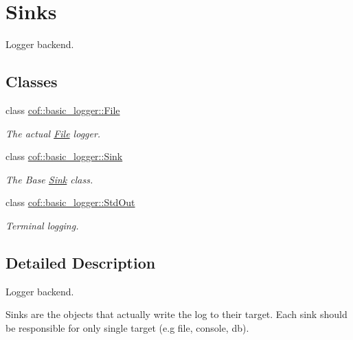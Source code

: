 \hypertarget{group___sinks}{}\section{Sinks}
\label{group___sinks}


Logger backend.  


\subsection*{Classes}
\begin{DoxyCompactItemize}
\item 
class \hyperlink{classcof_1_1basic__logger_1_1_file}{cof\+::basic\+\_\+logger\+::\+File}
\begin{DoxyCompactList}\small\item\em The actual \hyperlink{classcof_1_1basic__logger_1_1_file}{File} logger. \end{DoxyCompactList}\item 
class \hyperlink{classcof_1_1basic__logger_1_1_sink}{cof\+::basic\+\_\+logger\+::\+Sink}
\begin{DoxyCompactList}\small\item\em The Base \hyperlink{classcof_1_1basic__logger_1_1_sink}{Sink} class. \end{DoxyCompactList}\item 
class \hyperlink{classcof_1_1basic__logger_1_1_std_out}{cof\+::basic\+\_\+logger\+::\+Std\+Out}
\begin{DoxyCompactList}\small\item\em Terminal logging. \end{DoxyCompactList}\end{DoxyCompactItemize}


\subsection{Detailed Description}
Logger backend. 

Sinks are the objects that actually write the log to their target. Each sink should be responsible for only single target (e.\+g file, console, db). 